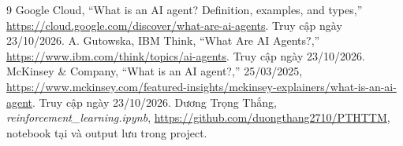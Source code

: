 \documentclass[12pt,a4paper]{report}
\begin{document}
\clearpage
\begin{thebibliography}{9}
 Google Cloud, ``What is an AI agent? Definition, examples, and types,''
\url{https://cloud.google.com/discover/what-are-ai-agents}. Truy cập ngày 23/10/2026.
 A. Gutowska, IBM Think, ``What Are AI Agents?,''
\url{https://www.ibm.com/think/topics/ai-agents}. Truy cập ngày 23/10/2026.
 McKinsey \& Company, ``What is an AI agent?,'' 25/03/2025,
\url{https://www.mckinsey.com/featured-insights/mckinsey-explainers/what-is-an-ai-agent}.
Truy cập ngày 23/10/2026.
 Dương Trọng Thắng, \emph{reinforcement\_learning.ipynb},
\url{https://github.com/duongthang2710/PTHTTM}, notebook tại
 và output lưu trong project.
\end{thebibliography}
\end{document}

